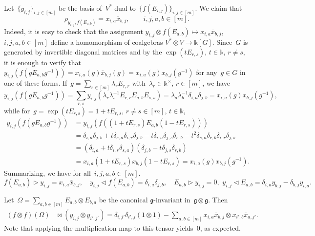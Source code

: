 \documentclass[12pt, reqno]{amsart}
\theoremstyle{definition}
\numberwithin{equation}{section}
\newcommand{\tensor}{\otimes}
\newcommand{\kk}{\mathbb{k}}\newcommand{\lie}[1]{{\mathfrak{#1}}}
\begin{document}
Let~$\{y_{i,j}\}_{i,j\in[m]}$
be the basis of~$V^*$ dual to~$\{ f(E_{i,j})\}_{i,j\in [m]}$. 
We claim that
$$
\rho_{y_{i,j},f(E_{a,b})}=x_{i,a}\bar x_{b,j},\qquad i,j,a,b\in[m].
$$
Indeed, it is easy to check that the assignment $y_{i,j}\tensor f(E_{a,b})\mapsto 
x_{i,a}\bar x_{b,j}$, $i,j,a,b\in[m]$ define a homomorphism of coalgebras $V^*\tensor V\to \kk[G]$. 
Since~$G$ is generated by invertible diagonal matrices and by the $\exp(t E_{r,s})$, $t\in\kk$, $r\not=s$, it is enough to verify that~$y_{i,j}(f(g E_{a,b}g^{-1}))=
x_{i,a}(g)\bar x_{b,j}(g)=x_{i,a}(g)x_{b,j}(g^{-1})$ for any~$g\in G$ in one of these forms. If~$g=\sum_{r\in[m]}\lambda_r E_{r,r}$ with~$\lambda_r\in\kk^\times$, 
$r\in [m]$, we have
$$
y_{i,j}(f(g E_{a,b} g^{-1}))=\sum_{r,s}y_{i,j}( \lambda_r\lambda_s^{-1} E_{r,r}E_{a,b}E_{s,s})=\lambda_a\lambda_b^{-1}\delta_{i,a}\delta_{j,b}
=x_{i,a}(g)x_{b,j}(g^{-1}),
$$
while for~$g=\exp(t E_{r,s})=1+t E_{r,s}$, $r\not=s\in[m]$, $t\in\kk$,
\begin{align*}
y_{i,j}(f(gE_{a,b}g^{-1}))&=
y_{i,j}(f((1+t E_{r,s})E_{a,b}(1-t E_{r,s})))\\
&=\delta_{i,a}\delta_{j,b}+t\delta_{s,a}\delta_{i,r}\delta_{j,b}-
t\delta_{i,a}\delta_{j,s}\delta_{r,b}-t^2
\delta_{s,a}\delta_{r,b}\delta_{i,r}\delta_{j,s}\\
&=(\delta_{i,a}+t \delta_{i,r}\delta_{s,a})(\delta_{j,b}-t \delta_{j,s}\delta_{r,b})\\
&=x_{i,a}(1+t E_{r,s})x_{b,j}(1-t E_{r,s})=x_{i,a}(g) x_{b,j}(g^{-1}).
\end{align*}
Summarizing, we have for all~$i,j,a,b\in[m]$.
$$
f(E_{a,b})\triangleright y_{i,j}=x_{i,a}\bar x_{b,j},\quad 
y_{i,j}\triangleleft f(E_{a,b})=\delta_{i,a}\delta_{j,b},
\quad 
E_{a,b}\triangleright y_{i,j}=0,\,\, y_{i,j}\triangleleft E_{a,b}=\delta_{i,a}y_{b,j}-\delta_{b,j}y_{i,a}.
$$



Let~$\Omega=\sum_{a,b\in[m]} E_{a,b}\tensor E_{b,a}$ be the canonical $\lie g$-invariant in~$\lie g\tensor\lie g$. Then
\begin{align*}
(f\tensor f)(\Omega)&\bowtie(y_{i,j}\tensor y_{i',j'})=
\delta_{i,j'}\delta_{i',j}(1\tensor1)-
\sum_{a,b\in[m]} x_{i,a}\bar x_{b,j}\tensor x_{i',b}\bar x_{a,j'}.
\end{align*}
Note that applying the multiplication map to this tensor yields~$0$, as expected.
\end{document}
